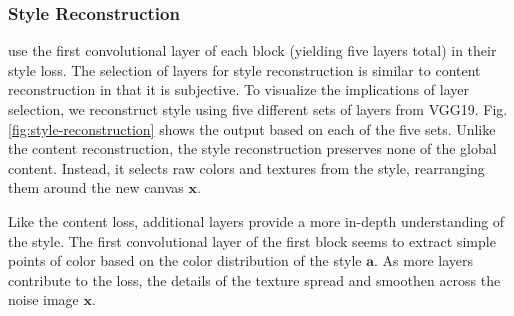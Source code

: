 \documentclass{article}
\begin{document}
\subsubsection{Style Reconstruction}

\cite{2015arXiv150806576G} use the first convolutional layer of each block
(yielding five layers total) in their style loss. The selection of layers
for style reconstruction is similar to content reconstruction in that it is
subjective. To visualize the implications of layer selection, we reconstruct
style using five different sets of layers from VGG19. Fig.
\ref{fig:style-reconstruction} shows the output based on each of the five
sets. Unlike the content reconstruction, the style reconstruction preserves
none of the global content. Instead, it selects raw colors and textures from
the style, rearranging them around the new canvas $\textbf{x}$.

Like the content loss, additional layers provide a more in-depth understanding
of the style. The first convolutional layer of the first block seems to
extract simple points of color based on the color distribution of the style
$\textbf{a}$. As more layers contribute to the loss, the details of the
texture spread and smoothen across the noise image $\textbf{x}$.
\end{document}
